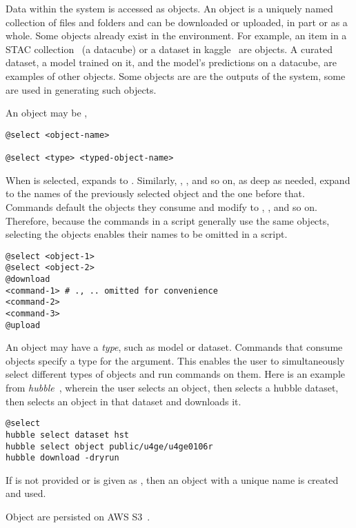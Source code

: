 Data within the system is accessed as objects. An object is a uniquely named collection of files and folders and can be downloaded or uploaded, in part or as a whole. Some objects already exist in the environment. For example, an item in a STAC collection~\cite{stac_intro_tutorial} (a datacube) or a dataset in kaggle~\cite{chen2019-AIRD-dataset} are objects. A curated dataset, a model trained on it, and the model's predictions on a datacube, are examples of other objects. Some objects are are the outputs of the system, some are used in generating such objects.

An object may be ,
%
\begin{verbatim}
@select <object-name>

@select <type> <typed-object-name>
\end{verbatim}
%
When  is selected,  expands to . Similarly, , , and so on, as deep as needed, expand to the names of the previously selected object and the one before that. Commands default the objects they consume and modify to , , and so on. Therefore, because the commands in a script generally use the same objects, selecting the objects enables their names to be omitted in a script.
%
\begin{verbatim}
@select <object-1>
@select <object-2>
@download
<command-1> # ., .. omitted for convenience
<command-2>
<command-3>
@upload
\end{verbatim}

An object may have a \emph{type}, such as model or dataset. Commands that consume objects specify a type for the argument. This enables the user to simultaneously select different types of objects and run commands on them. Here is an example from \emph{hubble}~\cite{hubble}, wherein the user selects an object, then selects a hubble dataset, then selects an object in that dataset and downloads it.
%
\begin{verbatim}
@select
hubble select dataset hst
hubble select object public/u4ge/u4ge0106r
hubble download -dryrun
\end{verbatim}

If  is not provided or is given as \keyword{-}, then an object with a unique name is created and used. 

Object are persisted on AWS S3~\cite{aws_s3}.

